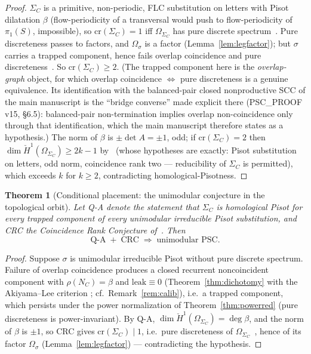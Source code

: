 \documentclass[11pt]{article}
\newtheorem{theorem}{Theorem}[section]
\begin{document}
\begin{proof}
$\Sigma_C$ is a primitive, non-periodic, FLC substitution on letters
with Pisot dilatation $\beta$ (flow-periodicity of a transversal would
push to flow-periodicity of $\pi_1(S)$, impossible), so
$\mathrm{cr}(\Sigma_C)=1$ iff $\Omega_{\Sigma_C}$ has pure discrete
spectrum~\cite[Thm.~4(5)]{B15}. Pure discreteness passes to factors,
and $\Omega_\sigma$ is a factor (Lemma~\ref{lem:legfactor}); but
$\sigma$ carries a trapped component, hence fails overlap coincidence
and pure discreteness~\cite{Sol97,AL11}. So $\mathrm{cr}(\Sigma_C)\ge
2$. (The trapped component here is the \emph{overlap-graph} object, for which
overlap coincidence $\Leftrightarrow$ pure discreteness is a genuine equivalence.
Its identification with the balanced-pair closed nonproductive SCC of the main
manuscript is the ``bridge converse'' made explicit there (PSC\_PROOF v15,
\S6.5): balanced-pair non-termination implies overlap non-coincidence only through
that identification, which the main manuscript therefore states as a hypothesis.) The norm of $\beta$ is $\pm\det A=\pm1$, odd; if
$\mathrm{cr}(\Sigma_C)=2$ then $\dim\check
H^1(\Omega_{\Sigma_C})\ge2k-1$ by~\cite[Thm.~22]{B15} (whose
hypotheses are exactly: Pisot substitution on letters, odd norm,
coincidence rank two --- reducibility of $\Sigma_C$ is permitted),
which exceeds $k$ for $k\ge2$, contradicting homological-Pisotness.
\end{proof}

\begin{theorem}[Conditional placement: the unimodular conjecture in the
topological orbit]\label{thm:QACRC}
Let Q-A denote the statement that $\Sigma_C$ is homological Pisot for
every trapped component of every unimodular irreducible Pisot
substitution, and CRC the Coincidence Rank Conjecture
of~\cite{BBJS12,B15}. Then
\[
\text{Q-A}\;+\;\text{CRC}\;\Longrightarrow\;\text{unimodular PSC}.
\]
\end{theorem}

\begin{proof}
Suppose $\sigma$ is unimodular irreducible Pisot without pure discrete
spectrum. Failure of overlap coincidence produces a closed recurrent
noncoincident component with $\rho(N_C)=\beta$ and $\mathrm{leak}
\equiv0$ (Theorem~\ref{thm:dichotomy} with the Akiyama--Lee criterion
\cite{AL11}; cf.\ Remark~\ref{rem:calib}), i.e.\ a trapped component,
which persists under the power normalization of
Theorem~\ref{thm:powerred} (pure discreteness is power-invariant). By
Q-A, $\dim\check H^1(\Omega_{\Sigma_C})=\deg\beta$, and the norm of
$\beta$ is $\pm1$, so CRC gives $\mathrm{cr}(\Sigma_C)\mid 1$, i.e.\
pure discreteness of $\Omega_{\Sigma_C}$~\cite[Thm.~4(5)]{B15}, hence
of its factor $\Omega_\sigma$ (Lemma~\ref{lem:legfactor}) ---
contradicting the hypothesis.
\end{proof}
\end{document}
